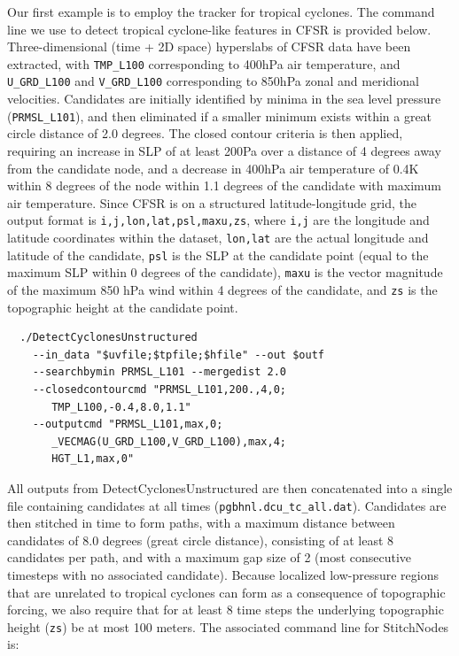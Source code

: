 \documentclass[gmdd, hvmath, online]{copernicus_discussions}
\begin{document}
Our first example is to employ the tracker for tropical cyclones.  The command line we use to detect tropical cyclone-like features in CFSR is provided below.  Three-dimensional (time + 2D space) hyperslabs of CFSR data have been extracted, with \texttt{TMP\_L100} corresponding to 400hPa air temperature, and \texttt{U\_GRD\_L100} and \texttt{V\_GRD\_L100} corresponding to 850hPa zonal and meridional velocities.  Candidates are initially identified by minima in the sea level pressure (\texttt{PRMSL\_L101}), and then eliminated if a smaller minimum exists within a great circle distance of 2.0 degrees.  The closed contour criteria is then applied, requiring an increase in SLP of at least 200Pa over a distance of 4 degrees away from the candidate node, and a decrease in 400hPa air temperature of 0.4K within 8 degrees of the node within 1.1 degrees of the candidate with maximum air temperature.  Since CFSR is on a structured latitude-longitude grid, the output format is \texttt{i,j,lon,lat,psl,maxu,zs}, where \texttt{i,j} are the longitude and latitude coordinates within the dataset, \texttt{lon,lat} are the actual longitude and latitude of the candidate, \texttt{psl} is the SLP at the candidate point (equal to the maximum SLP within 0 degrees of the candidate), \texttt{maxu} is the vector magnitude of the maximum 850 hPa wind within 4 degrees of the candidate, and \texttt{zs} is the topographic height at the candidate point.

{\small \begin{verbatim}
  ./DetectCyclonesUnstructured
    --in_data "$uvfile;$tpfile;$hfile" --out $outf
    --searchbymin PRMSL_L101 --mergedist 2.0
    --closedcontourcmd "PRMSL_L101,200.,4,0;
       TMP_L100,-0.4,8.0,1.1"
    --outputcmd "PRMSL_L101,max,0;
       _VECMAG(U_GRD_L100,V_GRD_L100),max,4;
       HGT_L1,max,0"
\end{verbatim}}

All outputs from DetectCyclonesUnstructured are then concatenated into a single file containing candidates at all times (\texttt{pgbhnl.dcu\_tc\_all.dat}).  Candidates are then stitched in time to form paths, with a maximum distance between candidates of 8.0 degrees (great circle distance), consisting of at least 8 candidates per path, and with a maximum gap size of 2 (most consecutive timesteps with no associated candidate).  Because localized low-pressure regions that are unrelated to tropical cyclones can form as a consequence of topographic forcing, we also require that for at least 8 time steps the underlying topographic height (\texttt{zs}) be at most 100 meters.  The associated command line for StitchNodes is:
\end{document}
